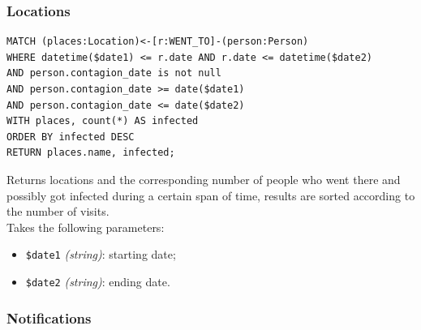 \documentclass[12pt, a4paper]{article}
\begin{document}
\subsubsection{Locations}
\begin{tcolorbox}[fontupper=\scriptsize]
    \begin{verbatim}
MATCH (places:Location)<-[r:WENT_TO]-(person:Person)
WHERE datetime($date1) <= r.date AND r.date <= datetime($date2) 
AND person.contagion_date is not null
AND person.contagion_date >= date($date1) 
AND person.contagion_date <= date($date2)
WITH places, count(*) AS infected
ORDER BY infected DESC
RETURN places.name, infected;
    \end{verbatim}
\end{tcolorbox}
\noindent %
Returns locations and the corresponding number of people who went there and 
possibly got infected during a certain span of time, results are sorted 
according to the number of visits. \\
Takes the following parameters: 
\begin{itemize}
    \item \texttt{\$date1} \emph{(string)}: starting date;
    \item \texttt{\$date2} \emph{(string)}: ending date.
\end{itemize}

\subsubsection{Notifications}
\end{document}
